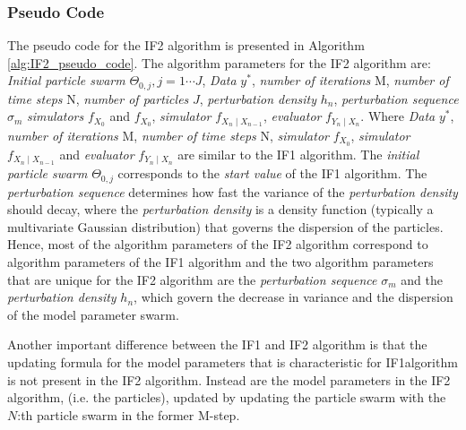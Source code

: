 \documentclass[twoside,openright]{report}
\begin{document}
\subsubsection{Pseudo Code}
The pseudo code for the IF2 algorithm is presented in Algorithm \ref{alg:IF2_pseudo_code}. The algorithm parameters for the IF2 algorithm are: \textit{Initial particle swarm} $\Theta_{0,j} , j = 1 \cdots J$, \textit{Data} $y^{*}$, \textit{number of iterations} M, \textit{number of time steps} N,  \textit{number of particles} $J$, \textit{perturbation density} $h_n$, \textit{perturbation sequence} $\sigma_m$  \textit{simulators} $f_{X_0}$ and $f_{X_0}$, \textit{simulator} $f_{X_n \mid X_{n-1}}$, \textit{evaluator} $f_{Y_n \mid X_n}$. Where \textit{Data} $y^{*}$,  \textit{number of iterations} M,  \textit{number of time steps} N,  \textit{simulator} $f_{X_0}$, \textit{simulator} $f_{X_n \mid X_{n-1}}$ and \textit{evaluator} $f_{Y_n \mid X_n}$ are similar to the IF1 algorithm.  The \textit{initial particle swarm} $\Theta_{0,j}$  corresponds to the \textit{start value} of the IF1 algorithm. The \textit{perturbation sequence} determines how fast the variance of the \textit{perturbation density} should decay, where the  \textit{perturbation density} is a density function (typically a multivariate Gaussian distribution) that governs the dispersion of the particles.  Hence, most of the algorithm parameters of the IF2 algorithm correspond to algorithm parameters of the IF1 algorithm and the two algorithm parameters that are unique for the IF2 algorithm are the \textit{perturbation sequence}  $\sigma_m$  and the \textit{perturbation density} $h_n$, which govern the decrease in variance and the dispersion of the model parameter swarm.  

Another important difference between the IF1 and IF2 algorithm is that the updating formula for the model parameters that is characteristic for IF1algorithm is not present in the IF2 algorithm. Instead are the model parameters in the IF2 algorithm, (i.e. the particles), updated by updating the particle swarm with the $N$:th particle swarm in the former M-step. 
\end{document}
